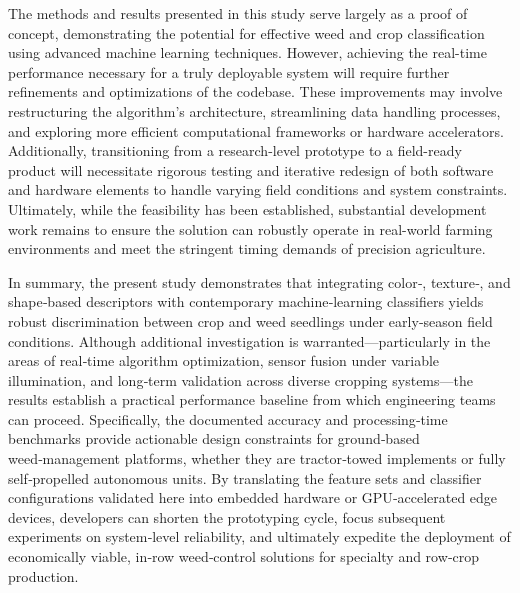 \documentclass[letterpaper, notitlepage]{report}
\begin{document}
The methods and results presented in this study serve largely as a proof of concept, demonstrating the potential for effective weed and crop classification using advanced machine learning techniques. However, achieving the real-time performance necessary for a truly deployable system will require further refinements and optimizations of the codebase. These improvements may involve restructuring the algorithm’s architecture, streamlining data handling processes, and exploring more efficient computational frameworks or hardware accelerators. Additionally, transitioning from a research-level prototype to a field-ready product will necessitate rigorous testing and iterative redesign of both software and hardware elements to handle varying field conditions and system constraints. Ultimately, while the feasibility has been established, substantial development work remains to ensure the solution can robustly operate in real-world farming environments and meet the stringent timing demands of precision agriculture.

In summary, the present study demonstrates that integrating color‑, texture‑, and shape‑based descriptors with contemporary machine‑learning classifiers yields robust discrimination between crop and weed seedlings under early‑season field conditions. Although additional investigation is warranted---particularly in the areas of real‑time algorithm optimization, sensor fusion under variable illumination, and long‑term validation across diverse cropping systems---the results establish a practical performance baseline from which engineering teams can proceed. Specifically, the documented accuracy and processing‑time benchmarks provide actionable design constraints for ground‑based weed‑management platforms, whether they are tractor‑towed implements or fully self‑propelled autonomous units. By translating the feature sets and classifier configurations validated here into embedded hardware or GPU‑accelerated edge devices, developers can shorten the prototyping cycle, focus subsequent experiments on system‑level reliability, and ultimately expedite the deployment of economically viable, in‑row weed‑control solutions for specialty and row‑crop production.
\end{document}
